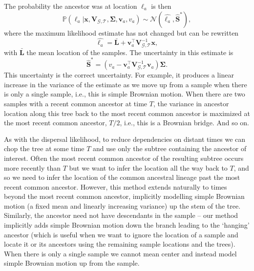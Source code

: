 \documentclass[12pt]{article}
\begin{document}
The probability the ancestor was at location $\bm{\ell}_a$ is then
%
\begin{equation}\label{eq:PsaCentered}
\mathbb{P}(\bm{\ell}_a | \mathbf{x}, \mathbf{V}_{\mathcal{G},\mathcal{T}}, \mathbf{\Sigma}, \mathbf{v}_a, v_a) \sim \mathcal{N}\left(\widehat{\bm{\ell}_a}, \widehat{\mathbf{S}}^* \right),
\end{equation}
%
where the maximum likelihood estimate has not changed but can be rewritten
\begin{equation}\label{eq:sahatCentered}
\widehat{\bm{\ell}_a} = \bar{\mathbf{L}} + \mathbf{v}_a^\intercal \mathbf{V}_{\mathcal{G},\mathcal{T}}^{-1} \mathbf{x}, 
\end{equation}
%
with $\bar{\mathbf{L}}$ the mean location of the samples. 
The uncertainty in this estimate is
%
\begin{equation}\label{eq:ChatCentered}
\widehat{\mathbf{S}}^* = \left( v_a - \mathbf{v}_a^\intercal \mathbf{V}_{\mathcal{G},\mathcal{T}}^{-1} \mathbf{v}_a \right) \mathbf{\Sigma}.
\end{equation}
%
This uncertainty is the correct uncertainty.
For example, it produces a linear increase in the variance of the estimate as we move up from a sample when there is only a single sample, i.e., this is simple Brownian motion.
When there are two samples with a recent common ancestor at time $T$, the variance in ancestor location along this tree back to the most recent common ancestor is maximized at the most recent common ancestor, $T/2$, i.e., this is a Brownian bridge.
And so on.

As with the dispersal likelihood, to reduce dependencies on distant times we can chop the tree at some time $T$ and use only the subtree containing the ancestor of interest. 
Often the most recent common ancestor of the resulting subtree occurs more recently than $T$ but we want to infer the location all the way back to $T$, and so we need to infer the location of the common ancestral lineage past the most recent common ancestor. 
However, this method extends naturally to times beyond the most recent common ancestor, implicitly modelling simple Brownian motion (a fixed mean and linearly increasing variance) up the stem of the tree.
Similarly, the ancestor need not have descendants in the sample -- our method implicitly adds simple Brownian motion down the branch leading to the `hanging' ancestor (which is useful when we want to ignore the location of a sample and locate it or its ancestors using the remaining sample locations and the trees).
When there is only a single sample we cannot mean center and instead model simple Brownian motion up from the sample.
\end{document}
